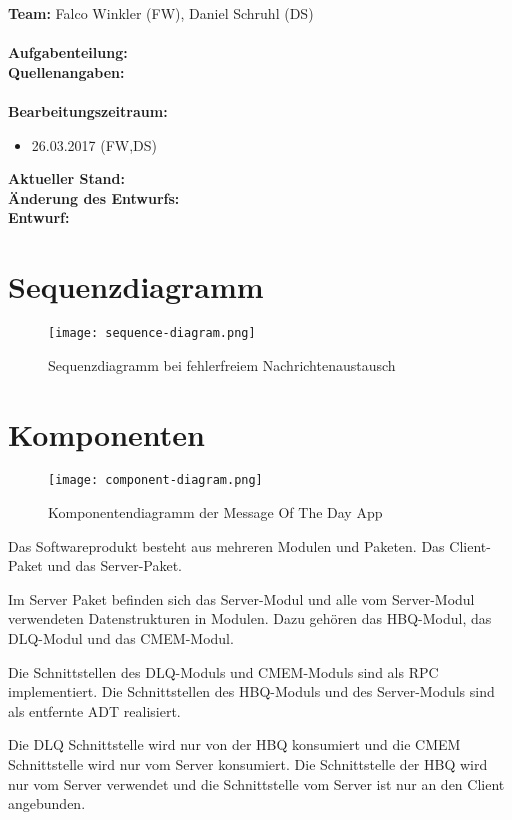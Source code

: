 \documentclass{scrreprt}
\begin{document}
\textbf{Team:} Falco Winkler (FW), Daniel Schruhl (DS)\\
\\
\textbf{Aufgabenteilung:}\\

\textbf{Quellenangaben:}\\
\\
\textbf{Bearbeitungszeitraum:}
\begin{itemize}
	\item 26.03.2017 (FW,DS)
\end{itemize}

\textbf{Aktueller Stand:}\\

\textbf{Änderung des Entwurfs:}\\

\textbf{Entwurf:}\\
{\let\clearpage\relax \chapter{Sequenzdiagramm}}
\begin{figure}[!htb]
\centering
	\texttt{[image: sequence-diagram.png]}
\caption[seq-dia]{Sequenzdiagramm bei fehlerfreiem Nachrichtenaustausch}
\label{fig:sequence-diagram}
\end{figure}

{\let\clearpage\relax \chapter{Komponenten}}

\begin{figure}[!htb]
\centering
	\texttt{[image: component-diagram.png]}
\caption[seq-dia]{Komponentendiagramm der Message Of The Day App}
\label{fig:component-diagram}
\end{figure}

Das Softwareprodukt besteht aus mehreren Modulen und Paketen. Das Client-Paket und das Server-Paket.

Im Server Paket befinden sich das Server-Modul und alle vom Server-Modul verwendeten Datenstrukturen in Modulen.
Dazu gehören das HBQ-Modul, das DLQ-Modul und das CMEM-Modul.

Die Schnittstellen des DLQ-Moduls und CMEM-Moduls sind als RPC implementiert. Die Schnittstellen des HBQ-Moduls und des
Server-Moduls sind als entfernte ADT realisiert.

Die DLQ Schnittstelle wird nur von der HBQ konsumiert und die CMEM Schnittstelle wird nur vom Server konsumiert.
Die Schnittstelle der HBQ wird nur vom Server verwendet und die Schnittstelle vom Server ist nur an den Client angebunden.
\end{document}
